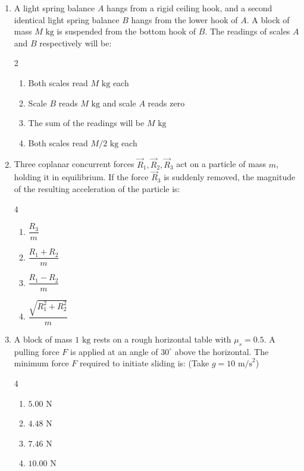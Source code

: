 \documentclass[11pt,a4paper]{article}
\begin{document}
\begin{enumerate}[label=\textbf{\arabic*.},leftmargin=18pt,itemsep=8pt,resume]
  \item A light spring balance $A$ hangs from a rigid ceiling hook, and a second identical light spring balance $B$ hangs from the lower hook of $A$. A block of mass $M\text{ kg}$ is suspended from the bottom hook of $B$. The readings of scales $A$ and $B$ respectively will be:
  \begin{multicols}{2}
    \begin{enumerate}[label=(\Alph*)]
      \item Both scales read $M\text{ kg}$ each
      \item Scale $B$ reads $M\text{ kg}$ and scale $A$ reads zero
      \item The sum of the readings will be $M\text{ kg}$
      \item Both scales read $M/2\text{ kg}$ each
    \end{enumerate}
  \end{multicols}

  \item Three coplanar concurrent forces $\vec{R}_1, \vec{R}_2, \vec{R}_3$ act on a particle of mass $m$, holding it in equilibrium. If the force $\vec{R}_3$ is suddenly removed, the magnitude of the resulting acceleration of the particle is:
  \begin{multicols}{4}
    \begin{enumerate}[label=(\Alph*)]
      \item $\dfrac{R_3}{m}$
      \item $\dfrac{R_1 + R_2}{m}$
      \item $\dfrac{R_1 - R_2}{m}$
      \item $\dfrac{\sqrt{R_1^2 + R_2^2}}{m}$
    \end{enumerate}
  \end{multicols}

  \item A block of mass $1\text{ kg}$ rests on a rough horizontal table with $\mu_s = 0.5$. A pulling force $F$ is applied at an angle of $30^\circ$ above the horizontal. The minimum force $F$ required to initiate sliding is: (Take $g = 10\text{ m/s}^2$)
  \begin{multicols}{4}
    \begin{enumerate}[label=(\Alph*)]
      \item $5.00\text{ N}$
      \item $4.48\text{ N}$
      \item $7.46\text{ N}$
      \item $10.00\text{ N}$
    \end{enumerate}
  \end{multicols}


\end{enumerate}
\end{document}
